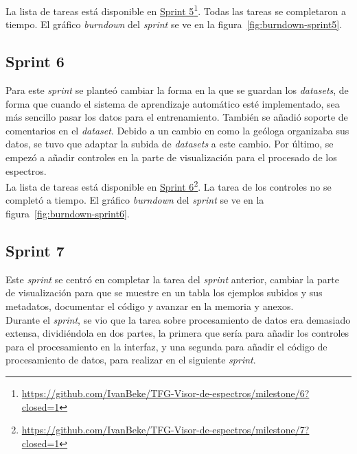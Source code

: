 La lista de tareas está disponible en
\href{https://github.com/IvanBeke/TFG-Visor-de-espectros/milestone/6?closed=1}{Sprint
	5}\footnote{\url{https://github.com/IvanBeke/TFG-Visor-de-espectros/milestone/6?closed=1}}.
Todas las tareas se completaron a tiempo. El gráfico \textit{burndown} del
\textit{sprint} se ve en la figura~\ref{fig:burndown-sprint5}.\\


\subsection{Sprint 6}
Para este \textit{sprint} se planteó cambiar la forma en la que se guardan los
\textit{datasets}, de forma que cuando el sistema de aprendizaje automático esté
implementado, sea más sencillo pasar los datos para el entrenamiento. También se
añadió soporte de comentarios en el \textit{dataset}. Debido a un cambio en como
la geóloga organizaba sus datos, se tuvo que adaptar la subida de
\textit{datasets} a este cambio. Por último, se empezó a añadir controles en la
parte de visualización para el procesado de los espectros.\\

La lista de tareas está disponible en
\href{https://github.com/IvanBeke/TFG-Visor-de-espectros/milestone/7?closed=1}{Sprint
	6}\footnote{\url{https://github.com/IvanBeke/TFG-Visor-de-espectros/milestone/7?closed=1}}.
La tarea de los controles no se completó a tiempo. El gráfico \textit{burndown}
del \textit{sprint} se ve en la figura~\ref{fig:burndown-sprint6}.\\


\subsection{Sprint 7}
Este \textit{sprint} se centró en completar la tarea del \textit{sprint}
anterior, cambiar la parte de visualización para que se muestre en un tabla los
ejemplos subidos y sus metadatos, documentar el código y avanzar en la memoria y
anexos.\\

Durante el \textit{sprint}, se vio que la tarea sobre procesamiento de datos era
demasiado extensa, dividiéndola en dos partes, la primera que sería para añadir 
los controles para el procesamiento en la interfaz, y una segunda para añadir el
código de procesamiento de datos, para realizar en el siguiente
\textit{sprint}.\\

